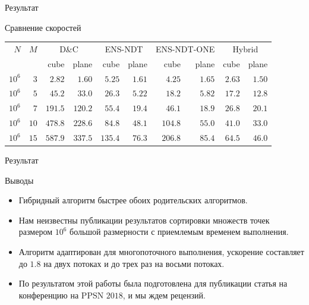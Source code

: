 \documentclass[table]{beamer}
\newcommand{\best}{\cellcolor{gray!50!white}}
\begin{document}
\begin{frame}{Результат}
\begin{block}{Сравнение скоростей}

\begin{center}
\begin{table}[!ht]
\begin{tabular}{rr|rr|rr|rr|rr}
$N$&$M$ & \multicolumn{2}{c|}{D\&C} 
        & \multicolumn{2}{c|}{ENS-NDT} 
        & \multicolumn{2}{c|}{ENS-NDT-ONE} 
        & \multicolumn{2}{c}{Hybrid} \\
& & {\scriptsize cube} & {\scriptsize plane} 
  & {\scriptsize cube} & {\scriptsize plane} 
  & {\scriptsize cube} & {\scriptsize plane} 
  & {\scriptsize cube} & {\scriptsize plane} \\\hline  %
      $10^6$&$3$  & $2.82$ & $1.60$ & $5.25$ & $1.61$ & $4.25$ & $1.65$ & \best $2.63$ & \best$1.50$\\\hline
      $10^6$&$5$  & $45.2$ & $33.0$ & $26.3$ & \best$5.22$ & $18.2$ & $5.82$ & \best $17.2$ & $12.8$\\\hline
      $10^6$&$7$  & $191.5$& $120.2$& $55.4$ & $19.4$ & $46.1$ & \best$18.9$ & \best $26.8$ & $20.1$\\\hline
      $10^6$&$10$ & $478.8$& $228.6$& $84.8$ & $48.1$ & $104.8$& $55.0$ & \best $41.0$ & \best $33.0$\\\hline
      $10^6$&$15$ & $587.9$& $337.5$& $135.4$& $76.3$ & $206.8$& $85.4$ & \best $64.5$ & \best $46.0$\\\hline
\end{tabular}
\end{table}
\end{center}
\end{block}
\end{frame}

\begin{frame}{Результат}
\begin{block}{Выводы}
\begin{itemize}
\item Гибридный алгоритм быстрее обоих родительских алгоритмов.
\item Нам неизвестны публикации результатов сортировки множеств точек размером $10^6$ большой размерности с приемлемым временем выполнения.
\item Алгоритм адаптирован для многопоточного выполнения, ускорение составляет до $1.8$ на двух потоках и до трех раз на восьми потоках.
\item По результатом этой работы была подготовлена для публикации статья на конференцию на PPSN $2018$, и мы ждем рецензий. 
\end{itemize}
\end{block}
\end{frame}
\end{document}
